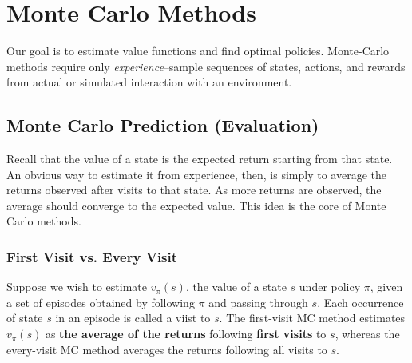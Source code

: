 \chapter{Monte Carlo Methods}
Our goal is to estimate value functions and find optimal policies. Monte-Carlo methods require only \textit{experience}--sample sequences of states, actions, and rewards from actual or simulated interaction with an environment. 

\section{Monte Carlo Prediction (Evaluation)}
Recall that the value of a state is the expected return starting from that state. An obvious way to estimate it from experience, then, is simply to average the returns observed after visits to that state. As more returns are observed, the average should converge to the expected value. This idea is the core of Monte Carlo methods. 

\subsection{First Visit vs. Every Visit}
Suppose we wish to estimate $v_\pi(s)$, the value of a state $s$ under policy $\pi$, given a set of episodes obtained by following $\pi$ and passing through $s$. Each occurrence of state $s$ in an episode is called a viist to $s$. The first-visit MC method estimates $v_\pi(s)$ as \textbf{the average of the returns} following \textbf{first visits} to $s$, whereas the every-visit MC method averages the returns following all visits to $s$.

%

